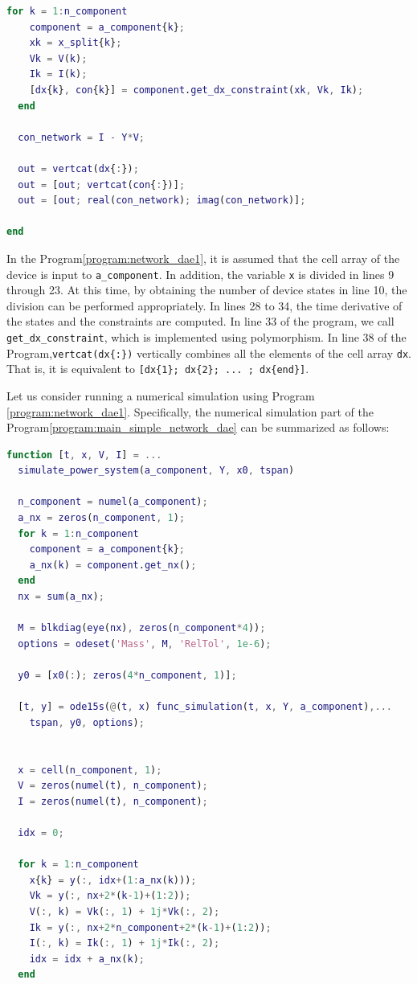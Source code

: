 \documentclass[graybox, envcountchap]{svmult}
\begin{document}
\begin{example}
\begin{lstlisting}[language=Matlab, caption=func\_simulation.m, label={program:network_dae1}]
  for k = 1:n_component
    component = a_component{k};
    xk = x_split{k};
    Vk = V(k);
    Ik = I(k);
    [dx{k}, con{k}] = component.get_dx_constraint(xk, Vk, Ik);
  end

  con_network = I - Y*V;

  out = vertcat(dx{:});
  out = [out; vertcat(con{:})];
  out = [out; real(con_network); imag(con_network)];

end
\end{lstlisting}

In the Program\nobreak\ref{program:network_dae1}, it is assumed that the cell
array of the device is input to \verb|a_component|. In addition, the variable
\verb|x| is divided in lines 9 through 23. At this time, by obtaining the number
of device states in line 10, the division can be performed appropriately. In
lines 28 to 34, the time derivative of the states and the constraints are
computed. In line 33 of the program, we call \verb|get_dx_constraint|, which is
implemented using polymorphism. In line 38 of the Program,\verb|vertcat(dx{:})|
vertically combines all the elements of the cell array \verb|dx|. That is, it is
equivalent to \verb|[dx{1}; dx{2}; ... ; dx{end}]|.

Let us consider running a numerical simulation using Program
\nobreak\ref{program:network_dae1}. Specifically, the numerical simulation part
of the Program\nobreak\ref{program:main_simple_network_dae} can be summarized as
follows: 

\begin{lstlisting}[language=Matlab, caption=simulate\_power\_system.m, label={program:simulate_network1}]
function [t, x, V, I] = ...
  simulate_power_system(a_component, Y, x0, tspan)

  n_component = numel(a_component);
  a_nx = zeros(n_component, 1);
  for k = 1:n_component
    component = a_component{k};
    a_nx(k) = component.get_nx();
  end
  nx = sum(a_nx);

  M = blkdiag(eye(nx), zeros(n_component*4));
  options = odeset('Mass', M, 'RelTol', 1e-6);

  y0 = [x0(:); zeros(4*n_component, 1)];

  [t, y] = ode15s(@(t, x) func_simulation(t, x, Y, a_component),...
    tspan, y0, options);


  x = cell(n_component, 1);
  V = zeros(numel(t), n_component);
  I = zeros(numel(t), n_component);

  idx = 0;

  for k = 1:n_component
    x{k} = y(:, idx+(1:a_nx(k)));
    Vk = y(:, nx+2*(k-1)+(1:2));
    V(:, k) = Vk(:, 1) + 1j*Vk(:, 2);
    Ik = y(:, nx+2*n_component+2*(k-1)+(1:2));
    I(:, k) = Ik(:, 1) + 1j*Ik(:, 2);
    idx = idx + a_nx(k);
  end


\end{lstlisting}
\end{example}
\end{document}
